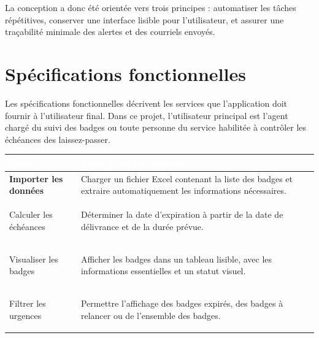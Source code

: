 \documentclass[12pt,a4paper,openany]{report}
\begin{document}
La conception a donc été orientée vers trois principes : automatiser les tâches
répétitives, conserver une interface lisible pour l'utilisateur, et assurer une
traçabilité minimale des alertes et des courriels envoyés.

\section{Spécifications fonctionnelles}

Les spécifications fonctionnelles décrivent les services que l'application doit
fournir à l'utilisateur final. Dans ce projet, l'utilisateur principal est
l'agent chargé du suivi des badges ou toute personne du service habilitée à
contrôler les échéances des laissez-passer.

\begin{table}[H]
\centering
\small
\renewcommand{\arraystretch}{1.5} %
\setlength{\arrayrulewidth}{1pt} %

\begin{tabularx}{\textwidth}{|>{\raggedright\arraybackslash\bfseries}p{}|>{\raggedright\arraybackslash}X|}
\hline
\rowcolor{ondaBlue} 
\textcolor{white}{\textbf{Besoin}} & \textcolor{white}{\textbf{Description fonctionnelle}} \\
\hline

\rowcolor{ondaBlue!5} 
Importer les données & Charger un fichier Excel contenant la liste des badges et extraire automatiquement les informations nécessaires. \\
\hline

Calculer les échéances & Déterminer la date d'expiration à partir de la date de délivrance et de la durée prévue. \\
\hline

\rowcolor{ondaBlue!5} 
Visualiser les badges & Afficher les badges dans un tableau lisible, avec les informations essentielles et un statut visuel. \\
\hline

Filtrer les urgences & Permettre l'affichage des badges expirés, des badges à relancer ou de l'ensemble des badges. \\
\hline


\end{tabularx}
\end{table}
\end{document}
